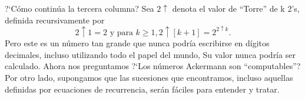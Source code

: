 ?`Cómo continúa la tercera columna? Sea $2\uparrow$ denota el valor de ``Torre'' de k 2's, definida recursivamente por \[ 2\uparrow 1=2 \text{ y para } k\geq1,2\uparrow[k+1]=2^{2\uparrow k}. \]
Pero este es un número tan grande que nunca podría escribirse en dígitos decimales, incluso utilizando todo el papel del mundo, Su valor nunca podría ser calculado. Ahora nos preguntamos ?`Los números Ackermann son ``computables''? Por otro lado, supongamos que las sucesiones que encontramos, incluso aquellas definidas por ecuaciones de recurrencia, serán fáciles para entender y tratar.